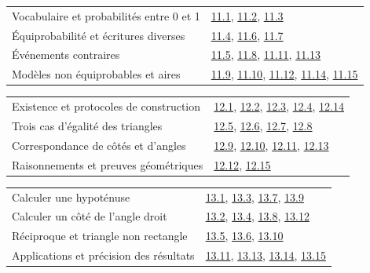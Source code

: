 \begin{tabularx}{\linewidth}{@{}Yl@{}}\toprule
Vocabulaire et probabilités entre 0 et 1 & \hyperref[exo-11-1]{11.1}, \hyperref[exo-11-2]{11.2}, \hyperref[exo-11-3]{11.3}\\[2mm]
Équiprobabilité et écritures diverses & \hyperref[exo-11-4]{11.4}, \hyperref[exo-11-6]{11.6}, \hyperref[exo-11-7]{11.7}\\[2mm]
Événements contraires & \hyperref[exo-11-5]{11.5}, \hyperref[exo-11-8]{11.8}, \hyperref[exo-11-11]{11.11}, \hyperref[exo-11-13]{11.13}\\[2mm]
Modèles non équiprobables et aires & \hyperref[exo-11-9]{11.9}, \hyperref[exo-11-10]{11.10}, \hyperref[exo-11-12]{11.12}, \hyperref[exo-11-14]{11.14}, \hyperref[exo-11-15]{11.15}\\[2mm]
\bottomrule\end{tabularx}\par\vspace{4mm}
\begin{tabularx}{\linewidth}{@{}Yl@{}}\toprule
Existence et protocoles de construction & \hyperref[exo-12-1]{12.1}, \hyperref[exo-12-2]{12.2}, \hyperref[exo-12-3]{12.3}, \hyperref[exo-12-4]{12.4}, \hyperref[exo-12-14]{12.14}\\[2mm]
Trois cas d’égalité des triangles & \hyperref[exo-12-5]{12.5}, \hyperref[exo-12-6]{12.6}, \hyperref[exo-12-7]{12.7}, \hyperref[exo-12-8]{12.8}\\[2mm]
Correspondance de côtés et d’angles & \hyperref[exo-12-9]{12.9}, \hyperref[exo-12-10]{12.10}, \hyperref[exo-12-11]{12.11}, \hyperref[exo-12-13]{12.13}\\[2mm]
Raisonnements et preuves géométriques & \hyperref[exo-12-12]{12.12}, \hyperref[exo-12-15]{12.15}\\[2mm]
\bottomrule\end{tabularx}\par\vspace{4mm}
\clearpage
{}\fontsize{10}{13}\selectfont
{}\begin{tabularx}{\linewidth}{@{}Yl@{}}\toprule
Calculer une hypoténuse & \hyperref[exo-13-1]{13.1}, \hyperref[exo-13-3]{13.3}, \hyperref[exo-13-7]{13.7}, \hyperref[exo-13-9]{13.9}\\[2mm]
Calculer un côté de l’angle droit & \hyperref[exo-13-2]{13.2}, \hyperref[exo-13-4]{13.4}, \hyperref[exo-13-8]{13.8}, \hyperref[exo-13-12]{13.12}\\[2mm]
Réciproque et triangle non rectangle & \hyperref[exo-13-5]{13.5}, \hyperref[exo-13-6]{13.6}, \hyperref[exo-13-10]{13.10}\\[2mm]
Applications et précision des résultats & \hyperref[exo-13-11]{13.11}, \hyperref[exo-13-13]{13.13}, \hyperref[exo-13-14]{13.14}, \hyperref[exo-13-15]{13.15}\\[2mm]
\bottomrule\end{tabularx}\par\vspace{4mm}
